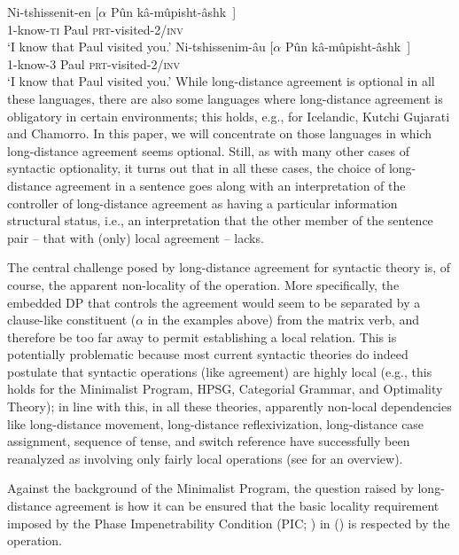 \documentclass[output=paper
,modfonts
,nonflat]{langsci/langscibook}
\begin{document}
\ea\label{ex:mueller:5}
\ea 
\gll Ni-tshissenit-en [$\alpha$ P\^{u}n k\^{a}-m\^{u}pisht-\^{a}shk~] \\
     1-know-{{\scshape ti}} {} Paul {\scshape prt}-visited-2/{\scshape inv} \\
\glt `I know that Paul visited you.'
\ex
\gll Ni-tshissenim-{\^a}u [$\alpha$ P\^{u}n k\^{a}-m\^{u}pisht-\^{a}shk~] \\
     1-know-{3} {} {Paul} {\scshape prt}-visited-2/{\scshape inv} \\
\glt `I know that Paul visited you.'
\z
\z
While long-distance agreement is optional in all these languages,
there are also some languages where long-distance agreement is
obligatory in certain environments; this holds, e.g., for Icelandic,
Kutchi Gujarati and Chamorro.  In this paper, we will concentrate on
those languages in which long-distance agreement seems
optional. Still, as with many other cases of syntactic optionality, it
turns out that in all these cases, the choice of long-distance
agreement in a sentence goes along with an interpretation of the
controller of long-distance agreement as having a particular
information structural status, i.e., an interpretation that the other
member of the sentence pair -- that with (only) local agreement --
lacks. 

The central challenge posed by long-distance agreement for syntactic
theory is, of course, the apparent non-locality of the operation. More
specifically, the embedded DP that controls the agreement would seem
to be separated by a clause-like constituent ($\alpha$ in the examples
above) from the matrix verb, and therefore be too far away to permit
establishing a local relation.  This is potentially problematic
because most current syntactic theories do indeed postulate that
syntactic operations (like agreement) are highly local (e.g., this
holds for the Minimalist Program, HPSG, Categorial Grammar, and Optimality
Theory); in line with this, in all these theories, apparently
non-local dependencies like long-distance movement, long-distance
reflexivization, long-distance case assignment, sequence of tense, and
switch reference have successfully been reanalyzed as involving only
fairly local operations (see \cite*{Alexiadouetal:12} for an
overview).

Against the background of the Minimalist Program, the question raised
by long-distance agreement is how it can be ensured that the basic
locality requirement imposed by the Phase Impenetrability Condition
(PIC; \cite{Chomsky:00,Chomsky:01,Chomsky:08,Chomsky:13}) in (\Next) is
respected by the operation. 
\end{document}
